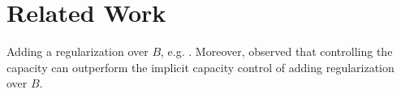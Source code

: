 \section{Related Work}


 Adding a regularization over $B$, e.g. \cite{LPTV09,LPVT11}.
Moreover, \cite{KD12} observed that controlling the capacity can outperform the implicit capacity control of adding regularization over $B$.